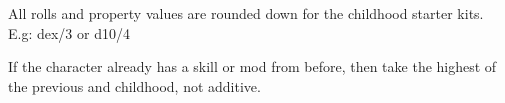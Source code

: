 All rolls and property values are rounded down for the childhood starter kits. E.g: dex/3 or d10/4

If the character already has a skill or mod from before, then take the highest of the previous and childhood, not additive.





